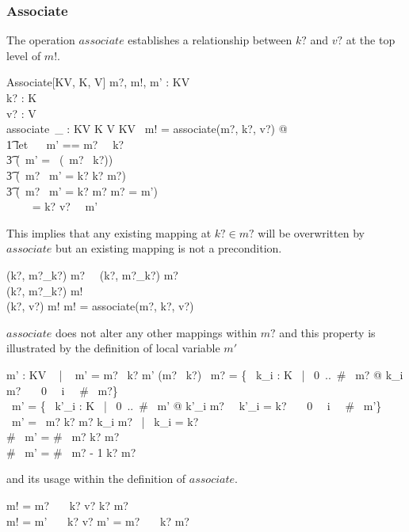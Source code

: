 \documentclass[../../main.tex]{subfiles}
\begin{document}
\subsubsection{Associate}
The operation $associate$ establishes a relationship between $k?$ and $v?$ at the top level of $m!$.
\begin{schema}{Associate[KV, K, V]}
  m?, m!, m' : KV \\
  k? : K \\
  v? : V \\
  associate~\_ : KV \cross K \cross V \bij KV\
  \where
  m! = associate(m?, k?, v?) @ \\
  \t1 let ~~ m' == m? ~\ndres ~k? \implies \\
  \t3 (\dom ~m' = \dom ~(~m? \setminus ~k?)) ~\land \\
  \t3 (~m? \setminus ~m' = k? \iff k? \in m?) ~\land \\
  \t3 (~m? \setminus ~m' = \emptyset \iff k? \not \in m? \implies m? = m')\\
  \ \ \ ~ = \ldata k? \mapsto v? \rdata ~\union ~m'
\end{schema}
This implies that any existing mapping at $k? \in m?$ will be overwritten by $associate$
but an existing mapping is not a precondition.
\begin{axdef}
  (k?, m?_{k?}) \in m? ~\lor ~(k?, m?_{k?}) \not \in m? \\
  (k?, m?_{k?}) \not \in m! \\
  (k?, v?) \in m!
  \where
  m! = associate(m?, k?, v?)
\end{axdef}
$associate$ does not alter any other mappings within $m?$ and this property is illustrated by the definition of local variable $m'$
\begin{axdef}
  m' : KV ~ | ~ m' = m? \ndres ~k? \implies m' \dres (m? \setminus ~k?)
  \where
  \dom ~m? = \{~ k_{i} : K ~|~ 0~..~\# ~m? @ k_{i} \in m? ~\land ~~0 ~\leq ~i ~\leq ~\# ~m?\} \\
  \dom ~m' = \{~ k'_{i} : K ~|~ 0~..~\# ~m' @ k'_{i} \in m? ~\land ~k'_{i} \not = k? ~\land ~~0 ~\leq ~i ~\leq ~\# ~m'\} \\
  \dom ~m' = \dom ~m? \iff k? \not \in m? \implies \forall k_{i} \in m? ~|~ k_{i} \not = k? \\
  \# ~m' = \# ~m? \iff k? \not \in m? \\
  \# ~m' = \# ~m? - 1 \iff k? \in m?
\end{axdef}
and its usage within the definition of $associate$.
\begin{zed}
  m! = m? ~\cup ~\ldata ~k? \mapsto v? \rdata \implies k? \not \in m? \\
  m! = m' ~\cup ~\ldata ~k? \mapsto v? \rdata \implies m' \not = m? ~\land ~~k? \in m?
\end{zed}
\end{document}
